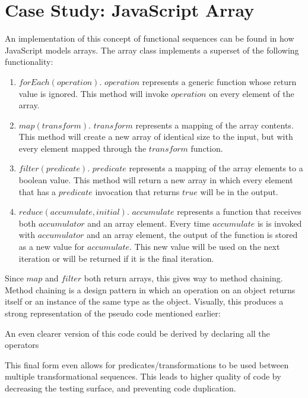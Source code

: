 \section{Case Study: JavaScript Array}

An implementation of this concept of functional sequences can be found in how JavaScript models arrays.  The array class implements a superset of the following functionality:

\begin{enumerate}
  \item $forEach(operation)$.  $operation$ represents a generic function whose return value is ignored.  This method will invoke $operation$ on every element of the array.

  \item $map(transform)$.  $transform$ represents a mapping of the array contents.  This method will create a new array of identical size to the input, but with every element mapped through the $transform$ function.

  \item $filter(predicate)$.  $predicate$ represents a mapping of the array elements to a boolean value.  This method will return a new array in which every element that has a $predicate$ invocation that returns $true$ will be in the output.

  \item $reduce(accumulate, initial)$.  $accumulate$ represents a function that receives both $accumulator$ and an array element. Every time $accumulate$ is is invoked with $accumulator$ and an array element, the output of the function is stored as a new value for $accumulate$.  This new value will be used on the next iteration or will be returned if it is the final iteration.

\end{enumerate}

Since $map$ and $filter$ both return arrays, this gives way to method chaining. Method chaining is a design pattern in which an operation on an object returns itself or an instance of the same type as the object. Visually, this produces a strong representation of the pseudo code mentioned earlier:

\begin{minipage}{\linewidth}

\end{minipage} 

An even clearer version of this code could be derived by declaring all the operators

\begin{minipage}{\linewidth}

\end{minipage}

This final form even allows for predicates/transformations to be used between multiple transformational sequences.  This leads to higher quality of code by decreasing the testing surface, and preventing code duplication. 